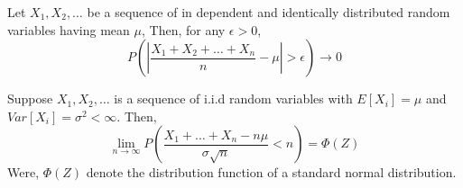 \begin{theorem}
    Let $X_1,X_2,\ldots$ be a sequence of in dependent and identically distributed 
    random variables having mean $ \mu $, Then, for any $ \epsilon >0 $,
    \[
        P \left( \left|\frac{X_1+X_2+ \ldots + X_n }{n} - \mu \right| > \epsilon \right) \to 0 
    \]
\end{theorem}

\begin{theorem}
    Suppose $X_1, X_2, \ldots  $ is a sequence of i.i.d random variables with 
    $E[X_i]=\mu$ and $Var[X_i]=\sigma ^{2} < \infty$. Then, 
    \[
        \lim_{n \to \infty} P\left( \frac{X_1+\ldots+X_n - n\mu}{\sigma \sqrt{n } } < n \right) = \Phi(Z)
    \]
    Were, $\Phi(Z)$ denote the distribution function of a standard normal distribution.
\end{theorem}


